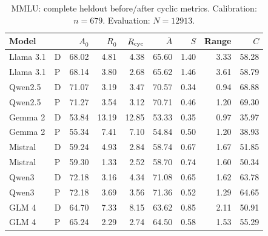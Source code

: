 \begin{table}[H]
\centering\small\setlength{\tabcolsep}{5pt}
\caption{MMLU: complete heldout before/after cyclic metrics. Calibration: $n=679$. Evaluation: $N=12913$.}\label{tab:corrected-mmlu}
\begin{tabular}{llrrrrrrr}
\toprule
Model &  & $A_0$ & $R_0$ & $R_{\rm cyc}$ & $\bar A$ & $S$ & Range & $C$\\
\midrule
Llama 3.1 & D & 68.02 & 4.81 & 4.38 & 65.60 & 1.40 & 3.33 & 58.28\\
Llama 3.1 & P & 68.14 & 3.80 & 2.68 & 65.62 & 1.46 & 3.61 & 58.79\\
Qwen2.5 & D & 71.07 & 3.19 & 3.47 & 70.57 & 0.34 & 0.94 & 68.88\\
Qwen2.5 & P & 71.27 & 3.54 & 3.12 & 70.71 & 0.46 & 1.20 & 69.30\\
Gemma 2 & D & 53.84 & 13.19 & 12.85 & 53.33 & 0.35 & 0.97 & 35.97\\
Gemma 2 & P & 55.34 & 7.41 & 7.10 & 54.84 & 0.50 & 1.20 & 38.93\\
Mistral & D & 59.24 & 4.93 & 2.84 & 58.74 & 0.67 & 1.67 & 51.85\\
Mistral & P & 59.30 & 1.33 & 2.52 & 58.70 & 0.74 & 1.60 & 50.34\\
Qwen3 & D & 72.18 & 3.16 & 4.34 & 71.08 & 0.65 & 1.62 & 63.78\\
Qwen3 & P & 72.18 & 3.69 & 3.56 & 71.36 & 0.52 & 1.29 & 64.65\\
GLM 4 & D & 64.70 & 7.33 & 8.15 & 63.62 & 0.85 & 2.11 & 50.91\\
GLM 4 & P & 65.24 & 2.29 & 2.74 & 64.50 & 0.58 & 1.53 & 55.29\\
\bottomrule
\end{tabular}
\end{table}


